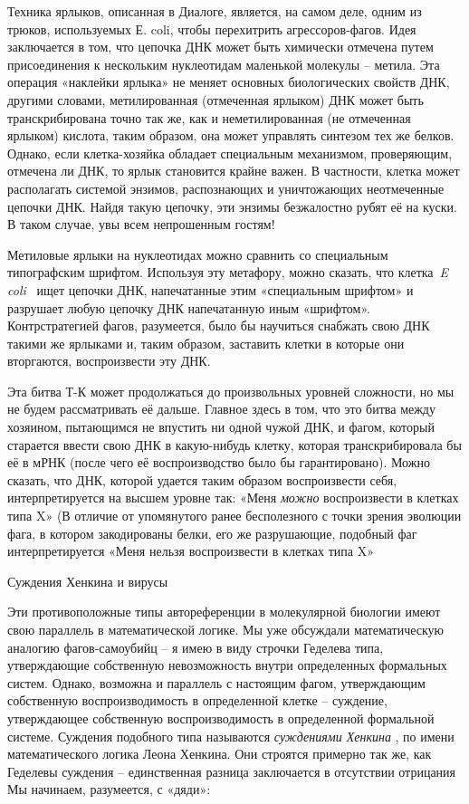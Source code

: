 \documentclass[../main.tex]{subfiles}
\begin{document}
Техника ярлыков, описанная в Диалоге, является, на самом деле, одним из трюков, используемых Е. coli, чтобы перехитрить агрессоров-фагов. Идея заключается в том, что цепочка ДНК может быть химически отмечена путем присоединения к нескольким нуклеотидам маленькой молекулы \--- метила. Эта операция «наклейки ярлыка» не меняет основных биологических свойств ДНК, другими словами, метилированная (отмеченная ярлыком) ДНК может быть транскрибирована точно так же, как и неметилированная (не отмеченная ярлыком) кислота, таким образом, она может управлять синтезом тех же белков. Однако, если клетка-хозяйка обладает специальным механизмом, проверяющим, отмечена ли ДНК, то ярлык становится крайне важен. В частности, клетка может располагать системой энзимов, распознающих и уничтожающих неотмеченные цепочки ДНК\@. Найдя такую цепочку, эти энзимы безжалостно рубят её на куски. В таком случае, увы всем непрошенным гостям!

Метиловые ярлыки на нуклеотидах можно сравнить со специальным типографским шрифтом. Используя эту метафору, можно сказать, что клетка~\emph{E coli} ~ищет цепочки ДНК, напечатанные этим «специальным шрифтом» и разрушает любую цепочку ДНК напечатанную иным «шрифтом». Контрстратегией фагов, разумеется, было бы научиться снабжать свою ДНК такими же ярлыками и, таким образом, заставить клетки в которые они вторгаются, воспроизвести эту ДНК.

Эта битва Т-К может продолжаться до произвольных уровней сложности, но мы не будем рассматривать её дальше. Главное здесь в том, что это битва между хозяином, пытающимся не впустить ни одной чужой ДНК, и фагом, который старается ввести свою ДНК в какую-нибудь клетку, которая транскрибировала бы её в мРНК (после чего её воспроизводство было бы гарантировано). Можно сказать, что ДНК, которой удается таким образом воспроизвести себя, интерпретируется на высшем уровне так: «Меня \emph{можно} воспроизвести в клетках типа X» (В отличие от упомянутого ранее бесполезного с точки зрения эволюции фага, в котором закодированы белки, его же разрушающие, подобный фаг интерпретируется «Меня нельзя воспроизвести в клетках типа X»

Суждения Хенкина и вирусы

Эти противоположные типы автореференции в молекулярной биологии имеют свою параллель в математической логике. Мы уже обсуждали математическую аналогию фагов-самоубийц \--- я имею в виду строчки Геделева типа, утверждающие собственную невозможность внутри определенных формальных систем. Однако, возможна и параллель с настоящим фагом, утверждающим собственную воспроизводимость в определенной клетке \--- суждение, утверждающее собственную воспроизводимость в определенной формальной системе. Суждения подобного типа называются \emph{суждениями Хенкина} , по имени математического логика Леона Хенкина. Они строятся примерно так же, как Геделевы суждения \--- единственная разница заключается в отсутствии отрицания Мы начинаем, разумеется, с «дяди»:
\end{document}
